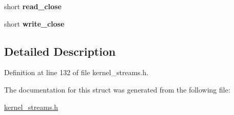 \begin{DoxyCompactItemize}
\item 
short {\bfseries read\+\_\+close}\hypertarget{structpipe__control__block_a056509d00ad11a6c77047753c5e6341d}{}\label{structpipe__control__block_a056509d00ad11a6c77047753c5e6341d}

\item 
short {\bfseries write\+\_\+close}\hypertarget{structpipe__control__block_a92ec2ce12158afe246e0dd378a14a3d0}{}\label{structpipe__control__block_a92ec2ce12158afe246e0dd378a14a3d0}

\end{DoxyCompactItemize}


\subsection{Detailed Description}


Definition at line 132 of file kernel\+\_\+streams.\+h.



The documentation for this struct was generated from the following file\+:\begin{DoxyCompactItemize}
\item 
\hyperlink{kernel__streams_8h}{kernel\+\_\+streams.\+h}\end{DoxyCompactItemize}

